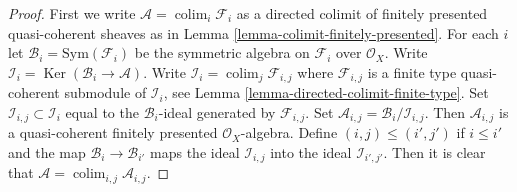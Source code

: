 \documentclass{stacks-project}
\theoremstyle{plain}
\theoremstyle{definition}
\theoremstyle{remark}
\numberwithin{equation}{subsection}
\def\colim{\mathop{\mathrm{colim}}\nolimits}
\def\Ker{\mathop{\mathrm{Ker}}}
\begin{document}
\begin{proof}
First we write $\mathcal{A} = \colim_i \mathcal{F}_i$ as a directed
colimit of finitely presented quasi-coherent sheaves as in
Lemma \ref{lemma-colimit-finitely-presented}.
For each $i$ let $\mathcal{B}_i = \text{Sym}(\mathcal{F}_i)$ be the
symmetric algebra on $\mathcal{F}_i$ over $\mathcal{O}_X$. Write
$\mathcal{I}_i = \Ker(\mathcal{B}_i \to \mathcal{A})$. Write
$\mathcal{I}_i = \colim_j \mathcal{F}_{i, j}$ where
$\mathcal{F}_{i, j}$ is a finite type quasi-coherent submodule of
$\mathcal{I}_i$, see
Lemma \ref{lemma-directed-colimit-finite-type}.
Set $\mathcal{I}_{i, j} \subset \mathcal{I}_i$
equal to the $\mathcal{B}_i$-ideal generated by $\mathcal{F}_{i, j}$.
Set $\mathcal{A}_{i, j} = \mathcal{B}_i/\mathcal{I}_{i, j}$.
Then $\mathcal{A}_{i, j}$ is a quasi-coherent finitely presented
$\mathcal{O}_X$-algebra. Define $(i, j) \leq (i', j')$ if
$i \leq i'$ and the map $\mathcal{B}_i \to \mathcal{B}_{i'}$
maps the ideal $\mathcal{I}_{i, j}$ into the ideal $\mathcal{I}_{i', j'}$.
Then it is clear that $\mathcal{A} = \colim_{i, j} \mathcal{A}_{i, j}$.
\end{proof}
\end{document}
